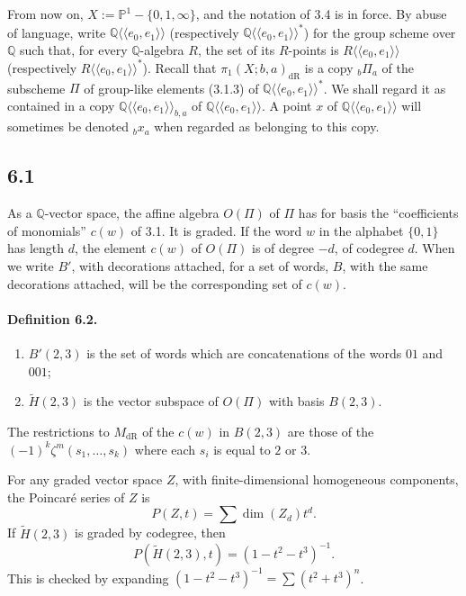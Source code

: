 \documentclass[10pt]{article}
\newcommand{\Q}{\mathbb Q}
\newcommand{\PP}{\mathbb P}
\newcommand{\dR}{\mathrm{dR}}
\begin{document}
From now on, $X:=\PP^1-\{0,1,\infty\}$, and the notation of 3.4 is in force.
By abuse of language, write $\Q\langle\!\langle e_0,e_1\rangle\!\rangle$ (respectively $\Q\langle\!\langle e_0,e_1\rangle\!\rangle^*$) for the group scheme over $\Q$ such that, for every $\Q$-algebra $R$, the set of its $R$-points is $R\langle\!\langle e_0,e_1\rangle\!\rangle$ (respectively $R\langle\!\langle e_0,e_1\rangle\!\rangle^*$).
Recall that $\pi_1(X;b,a)_{\dR}$ is a copy ${}_b\Pi_a$ of the subscheme $\Pi$ of group-like elements (3.1.3) of $\Q\langle\!\langle e_0,e_1\rangle\!\rangle^*$.
We shall regard it as contained in a copy $\Q\langle\!\langle e_0,e_1\rangle\!\rangle_{b,a}$ of $\Q\langle\!\langle e_0,e_1\rangle\!\rangle$.
A point $x$ of $\Q\langle\!\langle e_0,e_1\rangle\!\rangle$ will sometimes be denoted ${}_b x_a$ when regarded as belonging to this copy.

\subsection*{6.1}
As a $\Q$-vector space, the affine algebra $O(\Pi)$ of $\Pi$ has for basis the ``coefficients of monomials'' $c(w)$ of 3.1.
It is graded.
If the word $w$ in the alphabet $\{0,1\}$ has length $d$, the element $c(w)$ of $O(\Pi)$ is of degree $-d$, of codegree $d$.
When we write $B'$, with decorations attached, for a set of words, $B$, with the same decorations attached, will be the corresponding set of $c(w)$.

\paragraph{Definition 6.2.}
\begin{enumerate}[label=(\roman*)]
\item $B'(2,3)$ is the set of words which are concatenations of the words $01$ and $001$;
\item $\widetilde H(2,3)$ is the vector subspace of $O(\Pi)$ with basis $B(2,3)$.
\end{enumerate}
The restrictions to $M_{\dR}$ of the $c(w)$ in $B(2,3)$ are those of the $(-1)^k\zeta^m(s_1,\ldots,s_k)$ where each $s_i$ is equal to $2$ or $3$.

For any graded vector space $Z$, with finite-dimensional homogeneous components, the Poincaré series of $Z$ is
\begin{equation}
P(Z,t)=\sum \dim(Z_d)t^d .
\tag{6.2.1}
\end{equation}
If $\widetilde H(2,3)$ is graded by codegree, then
\begin{equation}
P(\widetilde H(2,3),t)=(1-t^2-t^3)^{-1}.
\tag{6.2.2}
\end{equation}
This is checked by expanding $(1-t^2-t^3)^{-1}=\sum(t^2+t^3)^n$.
\end{document}
